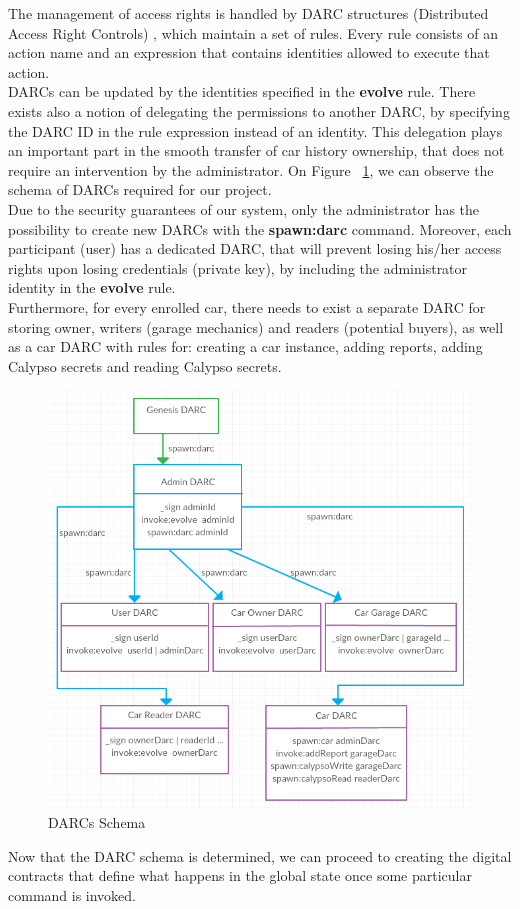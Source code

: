 The management of access rights is handled by DARC structures (Distributed Access Right Controls) \cite{Darc}, which maintain a set of rules.
Every rule consists of an action name and an expression that contains identities allowed to execute that action.\\
\newline
DARCs can be updated by the identities specified in the \textbf{evolve} rule. There exists also a notion of delegating the permissions to another DARC, by specifying the DARC ID in the rule expression instead of an identity. This delegation plays an important part in the smooth transfer of car history ownership, that does not require an intervention by the administrator. On Figure ~\ref{DARCs Schema}, we can observe the schema of DARCs required for our project.\\
\newline
Due to the security guarantees of our system, only the administrator has the possibility to create new DARCs with the \textbf{spawn:darc} command.
Moreover, each participant (user) has a dedicated DARC, that will prevent losing his/her access rights upon losing credentials (private key), by including the administrator identity in the \textbf{evolve} rule.\\
\newline
Furthermore, for every enrolled car, there needs to exist a separate DARC for storing owner, writers (garage mechanics) and readers (potential buyers), as well as a car DARC with rules for: creating a car instance, adding reports, adding Calypso secrets and reading Calypso secrets.
\begin{figure}[H]
    \centering
    \includegraphics[width=1\textwidth]{Figures/DARCs_schema.png}
    \caption{DARCs Schema}
    \label{DARCs Schema}
\end{figure}
\noindent
\newline
Now that the DARC schema is determined, we can proceed to creating the digital contracts that define what happens in the global state once some particular command is invoked.

